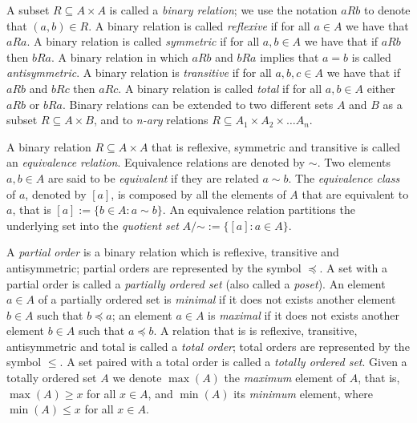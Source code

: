 A subset $R \subseteq A \times A$ is called a \emph{binary relation}; we use the notation $aRb$ to denote that $\left(a, b\right) \in R$. A binary relation is called \emph{reflexive} if for all $a \in A$ we have that $aRa$. A binary relation is called \emph{symmetric} if for all $a, b \in A$ we have that if $aRb$ then $bRa$. A binary relation in which $aRb$ and $bRa$ implies that $a = b$ is called \emph{antisymmetric}. A binary relation is \emph{transitive} if for all $a, b, c \in A$ we have that if $aRb$ and $bRc$ then $aRc$. A binary relation is called \emph{total} if for all $a, b \in A$ either $aRb$ or $bRa$. Binary relations can be extended to two different sets $A$ and $B$ as a subset $R \subseteq A \times B$, and to \emph{n-ary} relations $R \subseteq A_1 \times A_2 \times \dots A_n$.

A binary relation $R \subseteq A \times A$ that is reflexive, symmetric and transitive is called an \emph{equivalence relation}. Equivalence relations are denoted by $\sim$. Two elements $a, b \in A$ are said to be \emph{equivalent} if they are related $a \sim b$. The \emph{equivalence class} of $a$, denoted by $[a]$, is composed by all the elements of $A$ that are equivalent to $a$, that is $[a] := \{ b \in A : a \sim b\}$. An equivalence relation partitions the underlying set into the \emph{quotient set} $A / {\mathord {\sim }} := \{ [a] : a \in A \}$.

A \emph{partial order} is a binary relation which is reflexive, transitive and antisymmetric; partial orders are represented by the symbol $\preceq$. A set with a partial order is called a \emph{partially ordered set} (also called a \emph{poset}).  An element $a \in A$ of a partially ordered set is \emph{minimal} if it does not exists another element $b \in A$ such that $b \preceq a$; an element $a \in A$ is \emph{maximal} if it does not exists another element $b \in A$ such that $a \preceq b$. A relation that is is reflexive, transitive, antisymmetric and total is called a \emph{total order}; total orders are represented by the symbol $\leq$. A set paired with a total order is called a \emph{totally ordered set}. Given a totally ordered set $A$ we denote $\max(A)$ the \emph{maximum} element of $A$, that is, $\max(A) \geq x$ for all $x \in A$, and $\min(A)$ its \emph{minimum} element, where $\min(A) \leq x$ for all $x \in A$.

